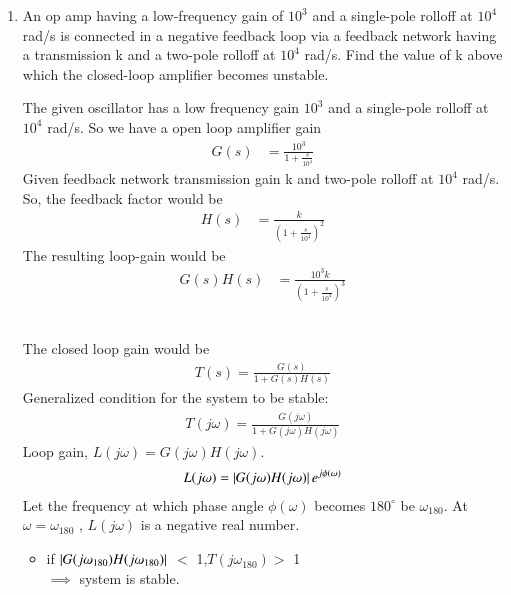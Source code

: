 
\begin{enumerate}[label=\thesection.\arabic*.,ref=\thesection.\theenumi]

\item An op amp having a low-frequency gain of $10^{3}$ and a single-pole rolloff at $10^{4}$ rad/s is connected in a negative feedback loop via a feedback network having a transmission k and a two-pole rolloff at $10^{4}$ rad/s. Find the value of k above which the closed-loop amplifier becomes unstable.


\solution 
The given oscillator has a low frequency gain $10^3$ and a single-pole rolloff at $10^4$ rad/s. So we have a open loop amplifier gain 
\begin{align}
G(s)&= \frac{10^3}{1+\frac{s}{10^4}}
\end{align}
Given feedback network transmission gain k and two-pole rolloff at $10^4$ rad/s. So, the feedback factor would be
\begin{align}
H(s)&= \frac{k}{\left(1+\frac{s}{10^4}\right)^2}   
\end{align}
The resulting loop-gain would be 
\begin{align}
G(s)H(s) &= \frac{10^3k}{\left(1+\frac{s}{10^4}\right)^3}
\end{align}
\begin{table}[!ht]
\centering

\caption{}
\label{table:ee18btech11006_Factors}
\end{table}\\
The closed loop gain would be
\begin{align}
T(s)=\frac{G(s)}{1+G(s)H(s)}
\end{align}
Generalized condition for the system to be stable:
\begin{align}
T(j\omega)=\frac{G(j\omega)}{1+G(j\omega)H(j\omega)}
\end{align}
Loop gain, $L(j\omega)=G(j\omega)H(j\omega)$.
\begin{align}
L(j\omega)=\left\vert{G(j\omega)H(j\omega)}\right\vert e^{j\phi(\omega)}
\end{align}
Let the frequency at which phase angle $\phi(\omega)$ becomes $180^{\circ}$ be $\omega_{180}$. At $\omega = \omega_{180}$ , $L(j\omega)$ is a negative real number.
\begin{itemize}
    \item if $\left\vert{G(j\omega_{180})H(j\omega_{180})}\right\vert$ $<$ 1,$T(j\omega_{180}) >$ 1 \\ $\implies$ 
    system is stable.

\end{itemize}
\end{enumerate}
